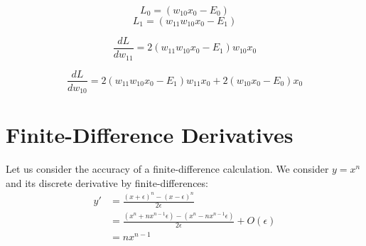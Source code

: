 \documentclass[11pt]{article}
\begin{document}
$$
L_0 = (w_{10} x_0  - E_0)
$$
$$
L_1 = (w_{11}w_{10} x_0 - E_1)
$$

$$
\frac{dL}{dw_{11}} = 2 (w_{11} w_{10} x_0 - E_1) w_{10} x_0
$$

$$
\frac{dL}{dw_{10}} = 2 (w_{11} w_{10} x_0 - E_1) w_{11} x_0
 + 2 (w_{10} x_0 - E_0) x_0
$$

\section{Finite-Difference Derivatives}
Let us consider the accuracy of a finite-difference calculation. 
We consider $y = x^n$ and its discrete derivative by finite-differences: 
\begin{align}
y' &= \frac{(x+\epsilon)^n - (x-\epsilon)^n}{2\epsilon}  \\
   &= \frac{ (x^n +n x^{n-1}\epsilon) - (x^n - n x^{n-1}\epsilon)}{2\epsilon} + O(\epsilon) \\
   &= n x^{n-1}
\end{align}
\end{document}
